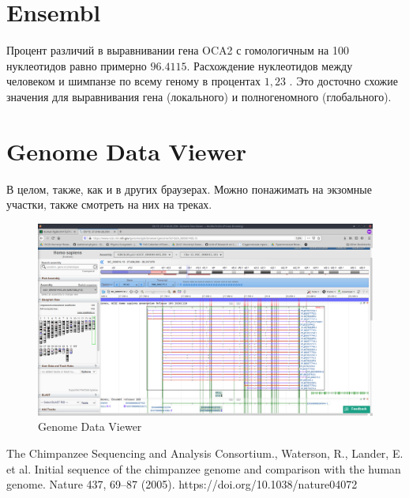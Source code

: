 \documentclass{article}
\begin{document}
  \section{Ensembl}
 Процент различий в выравнивании гена OCA2 с гомологичным на 100 нуклеотидов равно примерно $96.4115$. Расхождение нуклеотидов между человеком и шимпанзе по всему геному   в процентах  $1,23$ \cite{compare}. Это досточно схожие значения для выравнивания гена (локального) и полногеномного (глобального). 
   
   
   \section{ Genome Data Viewer}
   В целом, также, как и в других браузерах. Можно понажимать на экзомные участки, также смотреть на них на треках. 
    \begin{figure}[h]
   	\centering
   	\includegraphics[scale=0.23]{screenncbi}  
   	\caption{ Genome Data Viewer}
   	\label{tree}
   \end{figure}

\begin{thebibliography}{9}
The Chimpanzee Sequencing and Analysis Consortium., Waterson, R., Lander, E. et al. Initial sequence of the chimpanzee genome and comparison with the human genome. Nature 437, 69–87 (2005). https://doi.org/10.1038/nature04072
\end{thebibliography}
\end{document}

